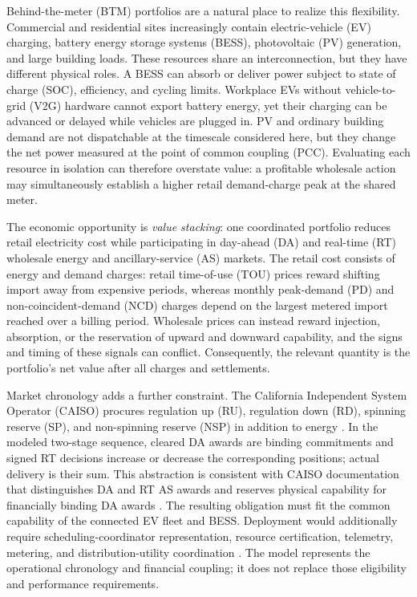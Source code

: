 \documentclass[final,5p,times]{elsarticle}
\begin{document}
Behind-the-meter (BTM) portfolios are a natural place to realize this flexibility. Commercial and residential sites increasingly contain electric-vehicle (EV) charging, battery energy storage systems (BESS), photovoltaic (PV) generation, and large building loads. These resources share an interconnection, but they have different physical roles. A BESS can absorb or deliver power subject to state of charge (SOC), efficiency, and cycling limits. Workplace EVs without vehicle-to-grid (V2G) hardware cannot export battery energy, yet their charging can be advanced or delayed while vehicles are plugged in. PV and ordinary building demand are not dispatchable at the timescale considered here, but they change the net power measured at the point of common coupling (PCC). Evaluating each resource in isolation can therefore overstate value: a profitable wholesale action may simultaneously establish a higher retail demand-charge peak at the shared meter.

The economic opportunity is \emph{value stacking}: one coordinated portfolio reduces retail electricity cost while participating in day-ahead (DA) and real-time (RT) wholesale energy and ancillary-service (AS) markets. The retail cost consists of energy and demand charges: retail time-of-use (TOU) prices reward shifting import away from expensive periods, whereas monthly peak-demand (PD) and non-coincident-demand (NCD) charges depend on the largest metered import reached over a billing period. Wholesale prices can instead reward injection, absorption, or the reservation of upward and downward capability, and the signs and timing of these signals can conflict. Consequently, the relevant quantity is the portfolio's net value after all charges and settlements.

Market chronology adds a further constraint. The California Independent System Operator (CAISO) procures regulation up (RU), regulation down (RD), spinning reserve (SP), and non-spinning reserve (NSP) in addition to energy \cite{caisoAncillary2026}. In the modeled two-stage sequence, cleared DA awards are binding commitments and signed RT decisions increase or decrease the corresponding positions; actual delivery is their sum. This abstraction is consistent with CAISO documentation that distinguishes DA and RT AS awards and reserves physical capability for financially binding DA awards \cite{caisoMarketOperations2026} \cite{caisoNGRCommitment2020}. The resulting obligation must fit the common capability of the connected EV fleet and BESS. Deployment would additionally require scheduling-coordinator representation, resource certification, telemetry, metering, and distribution-utility coordination \cite{caisoDER2026}. The model represents the operational chronology and financial coupling; it does not replace those eligibility and performance requirements.
\end{document}
